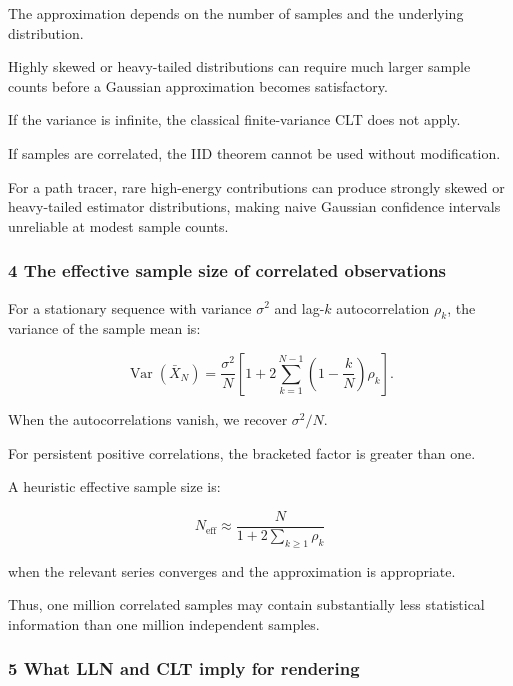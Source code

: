 The approximation depends on the number of samples and the underlying distribution.

Highly skewed or heavy-tailed distributions can require much larger sample counts before a Gaussian approximation becomes satisfactory.

If the variance is infinite, the classical finite-variance CLT does not apply.

If samples are correlated, the IID theorem cannot be used without modification.

For a path tracer, rare high-energy contributions can produce strongly skewed or heavy-tailed estimator distributions, making naive Gaussian confidence intervals unreliable at modest sample counts.

\subsubsection{4 The effective sample size of correlated observations}\label{02-foundations-ii-ch030-the-effective-sample-size-of-correlated-observations}

\hypertarget{02-foundations-ii-ch030-the-effective-sample-size-of-correlated-observations}{}

For a stationary sequence with variance \(\sigma^2\) and lag-\(k\) autocorrelation \(\rho_k\), the variance of the sample mean is:

\[
 \boxed{ \operatorname{Var}(\bar X_N) = \frac{\sigma^2}{N} \left[ 1+ 2\sum_{k=1}^{N-1} \left(1-\frac{k}{N}\right)\rho_k \right] }.
\]

When the autocorrelations vanish, we recover \(\sigma^2/N\).

For persistent positive correlations, the bracketed factor is greater than one.

A heuristic effective sample size is:

\[
 N_{\mathrm{eff}} \approx \frac{N}{ 1+2\sum_{k\ge1}\rho_k }
\]

when the relevant series converges and the approximation is appropriate.

Thus, one million correlated samples may contain substantially less statistical information than one million independent samples.

\subsubsection{5 What LLN and CLT imply for rendering}\label{02-foundations-ii-ch030-what-lln-and-clt-imply-for-rendering}

